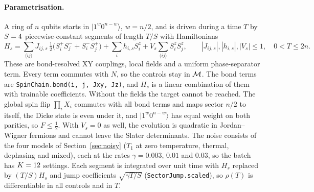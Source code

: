 \paragraph{Parametrisation.} A ring of $n$ qubits starts in $|1^w0^{n-w}\rangle$, $w=n/2$, and is driven during a time
$T$ by $S=4$ piecewise-constant segments of length $T/S$ with Hamiltonians
\begin{equation}\label{eq:control}
H_s=\sum_{\langle ij\rangle}J_{ij,s}\,\tfrac12\bigl(S^+_iS^-_j+S^-_iS^+_j\bigr)+\sum_ih_{i,s}S^z_i
+V_s\sum_{\langle ij\rangle}S^z_iS^z_j,\qquad |J_{ij,s}|,|h_{i,s}|,|V_s|\le1,\quad 0<T\le2n.
\end{equation}
These are bond-resolved XY couplings, local fields and a uniform phase-separator term. Every term commutes with $N$,
so the controls stay in $\mathcal{M}$. The bond terms are \texttt{SpinChain.bond(i, j, Jxy, Jz)}, and $H_s$ is a linear
combination of them with trainable coefficients. Without the fields the target cannot be reached. The global spin
flip $\prod_iX_i$ commutes with all bond terms and maps sector $n/2$ to itself, the Dicke state is even under it, and
$|1^w0^{n-w}\rangle$ has equal weight on both parities, so $F\le\frac12$. With $V_s=0$ as well, the evolution is
quadratic in Jordan--Wigner fermions and cannot leave the Slater determinants. The noise consists of the four models of
Section~\ref{sec:noisy} ($T_1$ at zero temperature, thermal, dephasing and mixed), each at the rates $\gamma=0.003$,
$0.01$ and $0.03$, so the batch has $K=12$ settings. Each segment is integrated over unit time with $H_s$
replaced by $(T/S)H_s$ and jump coefficients $\sqrt{\gamma T/S}$ (\texttt{SectorJump.scaled}), so $\rho(T)$ is
differentiable in all controls and in $T$.

